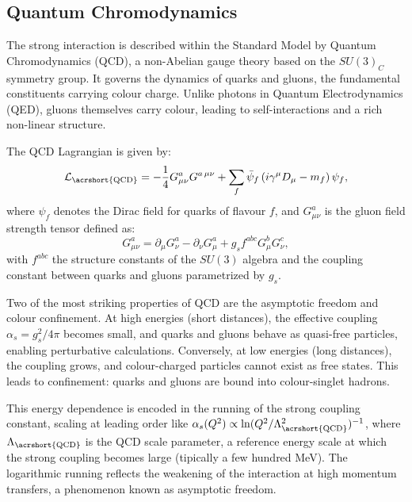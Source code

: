 \documentclass[11pt,twoside]{book}
\begin{document}
\subsection{Quantum Chromodynamics}
\label{subsec:QCD}

The strong interaction is described within the Standard Model by Quantum Chromodynamics (\acrshort{QCD}), a non-Abelian gauge theory based on the \(SU(3)_C\) symmetry group. It governs the dynamics of quarks and gluons, the fundamental constituents carrying colour charge. Unlike photons in Quantum Electrodynamics (\acrshort{QED}), gluons themselves carry colour, leading to self-interactions and a rich non-linear structure.

The \acrshort{QCD} Lagrangian is given by:
\begin{equation}
\mathcal{L}_{\mathrm{\acrshort{QCD}}} = -\frac{1}{4} G^{a}_{\mu\nu} G^{a\,\mu\nu} + \sum_{f} \bar{\psi}_f \left( i \gamma^\mu D_\mu - m_f \right) \psi_f,
\end{equation}
where \(\psi_f\) denotes the Dirac field for quarks of flavour \(f\), and \(G^a_{\mu\nu}\) is the gluon field strength tensor defined as:
\begin{equation}
G^a_{\mu\nu} = \partial_\mu G^a_\nu - \partial_\nu G^a_\mu + g_s f^{abc} G^b_\mu G^c_\nu,
\end{equation}
with \(f^{abc}\) the structure constants of the \(SU(3)\) algebra and the coupling constant between quarks and gluons parametrized by \(g_s\).

Two of the most striking properties of \acrshort{QCD} are the asymptotic freedom and colour confinement. At high energies (short distances), the effective coupling \(\alpha_s = g_s^2 / 4\pi\) becomes small, and quarks and gluons behave as quasi-free particles, enabling perturbative calculations. Conversely, at low energies (long distances), the coupling grows, and colour-charged particles cannot exist as free states. This leads to confinement: quarks and gluons are bound into colour-singlet hadrons.

This energy dependence is encoded in the running of the strong coupling constant, scaling at leading order like $\alpha_s(Q^2) \propto\ln(Q^2/\Lambda_{\mathrm{\acrshort{QCD}}}^2)^{-1}$, where \(\Lambda_{\mathrm{\acrshort{QCD}}}\) is the \acrshort{QCD} scale parameter, a reference energy scale at which the strong coupling becomes large (tipically a few hundred MeV). The logarithmic running reflects the weakening of the interaction at high momentum transfers, a phenomenon known as asymptotic freedom.
\end{document}
